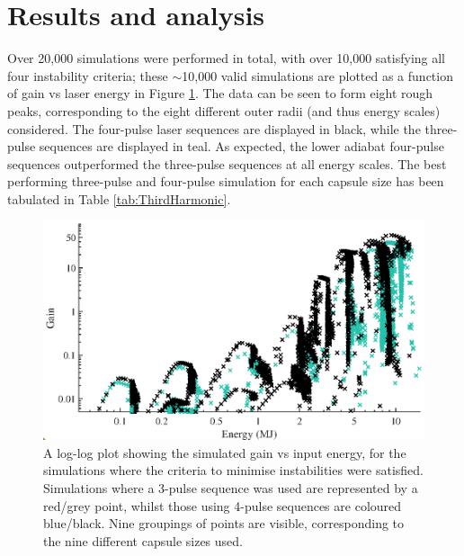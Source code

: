 \section{Results and analysis} \label{sec: LowCRResults}

Over 20,000 simulations were performed in total, with over 10,000 satisfying all four instability criteria; these $\sim$10,000 valid simulations are plotted as a function of gain vs laser energy in Figure \ref{fig:loglog}. The data can be seen to form eight rough peaks, corresponding to the eight different outer radii (and thus energy scales) considered. The four-pulse laser sequences are displayed in black, while the three-pulse sequences are displayed in teal. As expected, the lower adiabat four-pulse sequences outperformed the three-pulse sequences at all energy scales. The best performing three-pulse and four-pulse simulation for each capsule size has been tabulated in Table \ref{tab:ThirdHarmonic}. 

\begin{figure}[ht!]
\centering
\includegraphics{figures/LowCR/AllData_full.eps}
\caption{A log-log plot showing the simulated gain vs input energy, for the simulations where the criteria to minimise instabilities were satisfied. Simulations where a 3-pulse sequence was used are represented by a red/grey point, whilst those using 4-pulse sequences are coloured blue/black. Nine groupings of points are visible, corresponding to the nine different capsule sizes used.}
\label{fig:loglog}
\end{figure}


